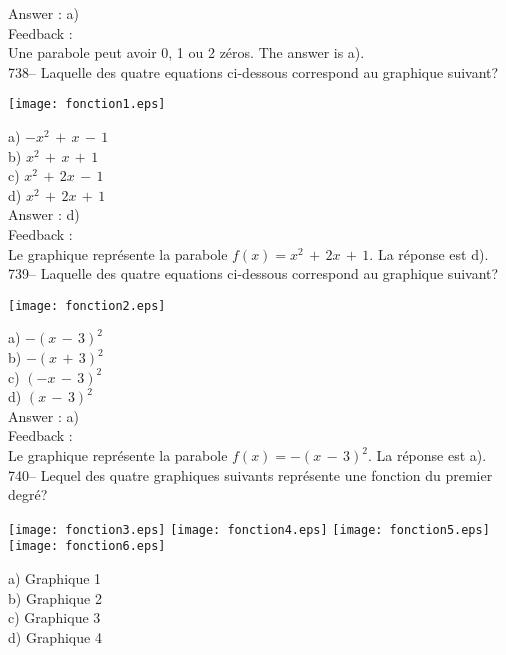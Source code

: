 \documentclass[letterpaper, 12pt]{article}
\begin{document}
Answer : a)\\

Feedback : \\
Une parabole peut avoir 0, 1 ou 2 z\'eros.  The answer is a).\\

738-- Laquelle des quatre equations ci-dessous correspond au graphique
suivant?\\
    \begin{center}
    \texttt{[image: fonction1.eps]}
    \end{center}

a) $-x^{2}\,+\,x\,-\,1$\\
b) $x^{2}\,+\,x\,+\,1$\\
c) $x^{2}\,+\,2x\,-\,1$\\
d) $x^{2}\,+\,2x\,+\,1$\\

Answer : d)\\

Feedback : \\
Le graphique repr\'esente la parabole $f(x)=x^{2}\,+\,2x\,+\,1$.  La
r\'eponse est d).\\

739-- Laquelle des quatre equations ci-dessous correspond au graphique
suivant?\\
    \begin{center}
    \texttt{[image: fonction2.eps]}
    \end{center}

a) $-(x\,-\,3)^{2}$\\
b) $-(x\,+\,3)^{2}$\\
c) $(-x\,-\,3)^{2}$\\
d) $(x\,-\,3)^{2}$\\

Answer : a)\\

Feedback : \\
Le graphique repr\'esente la parabole $f(x)=-(x\,-\,3)^{2}$.  La r\'eponse
est a).  \\

740-- Lequel des quatre graphiques suivants repr\'esente une fonction du
premier degr\'e?\\
    \begin{center}
    \texttt{[image: fonction3.eps]}
\texttt{[image: fonction4.eps]}
\texttt{[image: fonction5.eps]}
\texttt{[image: fonction6.eps]}
    \end{center}
a) Graphique 1\\
b) Graphique 2\\
c) Graphique 3\\
d) Graphique 4\\
\end{document}

